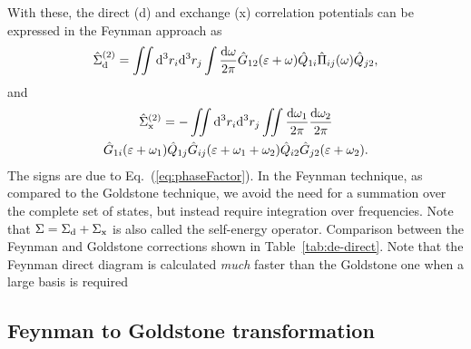\documentclass[10pt,twocolumn,a4paper]{article}%
\newcommand{\be}{\begin{equation}}
\newcommand{\ee}{\end{equation}}
\def\d{\ensuremath{{\rm d}}}
\def\en{\ensuremath{\varepsilon}}
\newcommand{\w}{\ensuremath{\omega}}
\begin{document}
With these, the direct (d) and exchange (x) correlation potentials can be expressed in the Feynman approach as
\be\label{eq:FeynDir}
\hat\Sigma^{(2)}_{\rm d}
= \iint\d^3 r_i\d^3 r_j
\int\frac{\d\w}{2\pi}\hat G_{12}(\en+\w)\hat Q_{1i}\hat\Pi_{ij}(\w)\hat Q_{j2},
\ee
and
\begin{multline}\label{eq:FeynExch}
\hat\Sigma^{(2)}_{\rm x}
= -\iint\d^3 r_i\d^3 r_j
\iint\frac{\d\w_1}{2\pi}\frac{\d\w_2}{2\pi}\\
\hat G_{1i}(\en+\w_1)\hat Q_{1j} \hat G_{ij}(\en+\w_1+\w_2)\hat Q_{i2}\hat G_{j2}(\en+\w_2).
\end{multline}
The signs are due to Eq.~(\ref{eq:phaseFactor}).
In the Feynman technique, as compared to the Goldstone technique, we avoid the need for a summation over the complete set of states, but instead require integration over frequencies.
Note that $\Sigma = \Sigma_{\rm d} + \Sigma_{\rm x}$ is also called the self-energy operator.
Comparison between the Feynman and Goldstone corrections shown in Table~\ref{tab:de-direct}.
Note that the Feynman direct diagram is calculated {\em much} faster than the Goldstone one when a large basis is required




\subsection{Feynman to Goldstone transformation}
\end{document}
